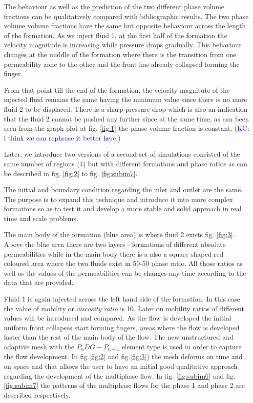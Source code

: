 \documentclass[preprint,authoryear,12pt]{elsarticle}
\begin{document}
The behaviour as well as the prediction of the two different phase volume fractions can be qualitatively compared with bibliographic results. The two phase volume volume fractions have the same but opposite behaviour across the length of the formation. As we inject fluid 1, at the first half of the formation the velocity magnitude is increasing while pressure drops gradually. This behaviour changes at the middle of the formation where there is the transition from one permeability zone to the other and the front has already collapsed forming the finger. 

From that point till the end of the formation, the velocity magnitute of the injected fluid remains the same having the minimum value since there is no more fluid 2 to be displaced. There is a sharp pressure drop which is also an indication that the fluid 2 cannot be pushed any further since at the same time, as can been seen from the graph plot at fig. \ref{fig:1} the phase volume fraction is constant. (\textcolor{blue}{KC: i think we can rephrase it better here.}) 

Later, we introduce two versions of a second set of simulations consisted of the same number of regions (4) but with different formations and phase ratios as can be described in fig. \ref{fig:2} to fig. \ref{fig:subim7}. 

The initial and boundary condition regarding the inlet and outlet are the same. The purpose is to expand this technique and introduce it into more complex formations so as to test it and develop a more stable and solid approach in real time and scale problems. 

The main body of the formation (blue area) is where fluid 2 exists fig. \ref{fig:3}. Above the blue area there are two layers - formations of different absolute permeabilities while in the main body there is a also a square shaped red coloured area where the two fluids exist in 50-50 phase ratio. All those ratios as well as the values of the permeabilities can be changes any time according to the data that are provided.

Fluid 1 is again injected across the left hand side of the formation. In this case the value of mobility or \textit{viscosity ratio} is 10. Later on mobility ratios of different values will be introduced and compared. As the flow is developed the initial uniform front collapses start forming fingers, areas where the flow is developed faster than the rest of the main body of the flow. The new unstructured and adaptive mesh with the $P_{n}DG-P_{n+1}$ element type is used in order to capture the flow development. In fig.\ref{fig:2} and fig.\ref{fig:3}) the mesh deforms on time and on space and that allows the user to have an initial good qualitative approach regarding the development of the multiphase flow. In fig. \ref{fig:subim6} and fig. \ref{fig:subim7} the patterns of the multiphase flows for the phase 1 and phase 2 are described respectively.
\end{document}
